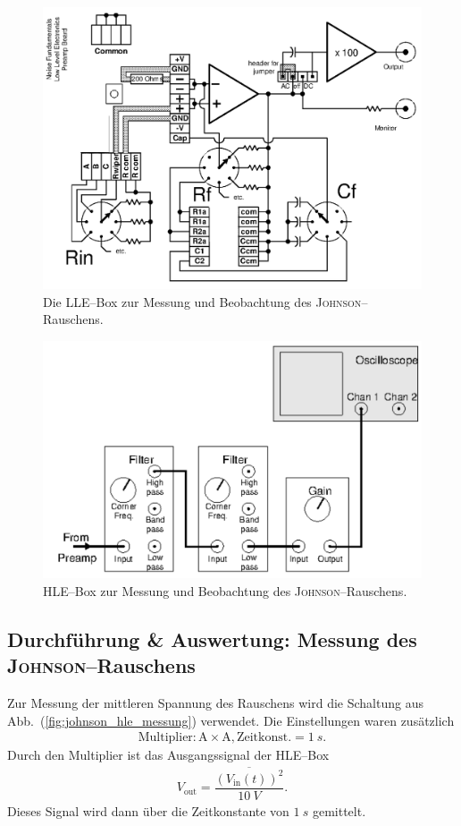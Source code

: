 \documentclass[sn-mathphys-num,iicol]{sn-jnl}
\theoremstyle{thmstyleone}
\theoremstyle{thmstyletwo}
\theoremstyle{thmstylethree}
\begin{document}
\begin{figure}[t]
	\centering
	\includegraphics[width=.5\textwidth]{425_schaltplan_johnson_LLE.png}
	\caption{Die LLE--Box zur Messung und Beobachtung des \textsc{Johnson}--Rauschens.\cite{anleitung425}} \label{fig:johnson_lle}
\end{figure}

\begin{figure}[t]
	\centering
	\includegraphics[width=.5\textwidth]{425_schaltplan_visualisierung_johnson_HLE.png}
	\caption{HLE--Box zur Messung und Beobachtung des \textsc{Johnson}--Rauschens.\cite{anleitung425}} \label{fig:johnson_hle}
\end{figure}

\subsection{Durchführung \& Auswertung: Messung des \textsc{Johnson}--Rauschens}
Zur Messung der mittleren Spannung des Rauschens wird die Schaltung aus Abb.\ (\ref{fig:johnson_hle_messung}) verwendet.
Die Einstellungen waren zusätzlich
\begin{align}
	\text{Multiplier}:\text{A}\times \text{A},\text{Zeitkonst.}=\SI{1}{s}
	.\end{align}
Durch den Multiplier ist das Ausgangssignal der HLE--Box
\begin{align}
	V_\text{out}=\dfrac{\overline{\left(V_\text{in}(t)\right)^2}}{\SI{10}{V}}
	.\end{align}
Dieses Signal wird dann über die Zeitkonstante von $\SI{1}{s}$ gemittelt.
\end{document}
